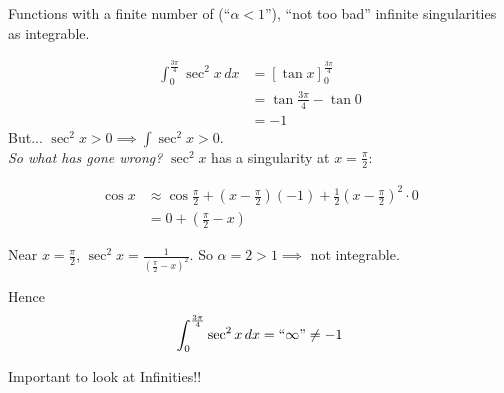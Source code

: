 \documentclass[twoside]{scrartcl}
\begin{document}
Functions with a finite number of (``$\alpha < 1$''), ``not too bad'' infinite singularities as integrable.\\

\begin{example}
\[
\begin{aligned}
  \int_0^{\frac{3\pi}{4}} \sec^2x\,dx &= \left[\tan x\right]_0^{\frac{3\pi}{4}}\\
  &= \tan \frac{3\pi}{4} - \tan 0\\
  &= -1
\end{aligned}
\]
But... $\sec^2x > 0 \implies \int \sec^2x> 0$.\\

\emph{So what has gone wrong?} $\sec^2x$ has a singularity at $x = \frac{\pi}{2}$: 


  \begin{center}
\end{center}




\[
\begin{aligned}
  \cos x &\approx \textstyle{\cos\frac{\pi}{2} + (x-\frac{\pi}{2})(-1) + \frac{1}{2}(x-\frac{\pi}{2})^2\cdot 0}\\
  &= 0 + \textstyle{(\frac{\pi}{2} - x)}
\end{aligned}
\]

Near $x = \frac{\pi}{2}$, $\sec^2x = \frac{1}{(\frac{\pi}{2}-x)^2}$. So $\alpha = 2 > 1 \implies$  not integrable. 

Hence 
\[\int_0^{\frac{3\pi}{4}}\sec^2x\,dx = ``\infty" \neq -1\]
\end{example}

\begin{warning} Important to look at Infinities!! \end{warning}
\end{document}
